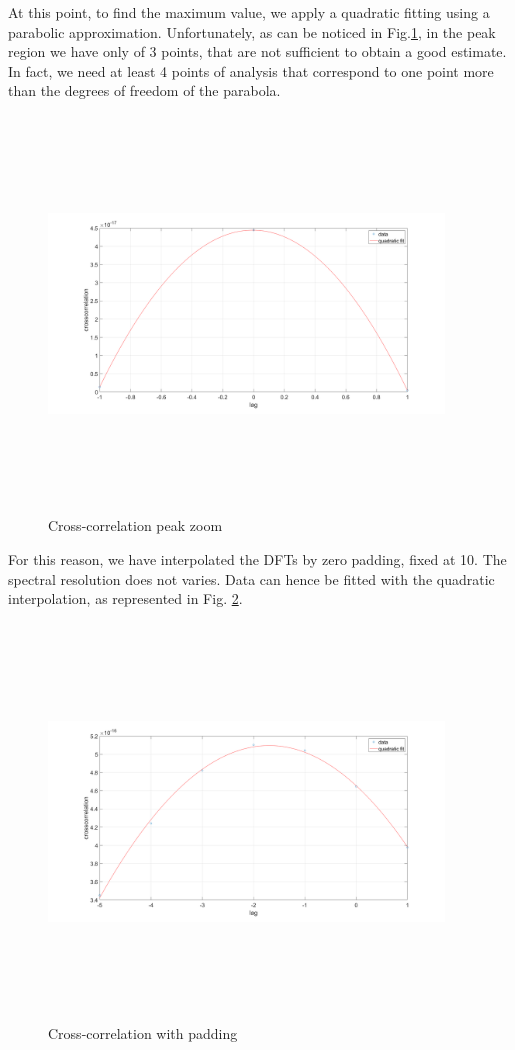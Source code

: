 At this point, to find the maximum value, we apply a quadratic fitting using a parabolic approximation. Unfortunately, as can be noticed in Fig.\ref{fig:3points}, in the peak region we have only of 3 points, that are not sufficient to obtain a good estimate. In fact, we need at least 4 points of analysis that correspond to one point more than the degrees of freedom of the parabola.
\begin{figure}[H]
	\centering
	\includegraphics[height=10.5cm, width=10.5cm, keepaspectratio]{img/3points.png}
	\caption{Cross-correlation peak zoom}\label{fig:3points}
\end{figure}

For this reason, we have interpolated the DFTs by zero padding, fixed at 10. The spectral resolution does not varies. Data can hence be fitted with the quadratic interpolation, as represented in Fig. \ref{fig:10padding}.

\begin{figure}[H]
	\centering
	\includegraphics[height=10.5cm, width=10.5cm, keepaspectratio]{img/padding10.png}
	\caption{Cross-correlation with padding}\label{fig:10padding}
\end{figure}

